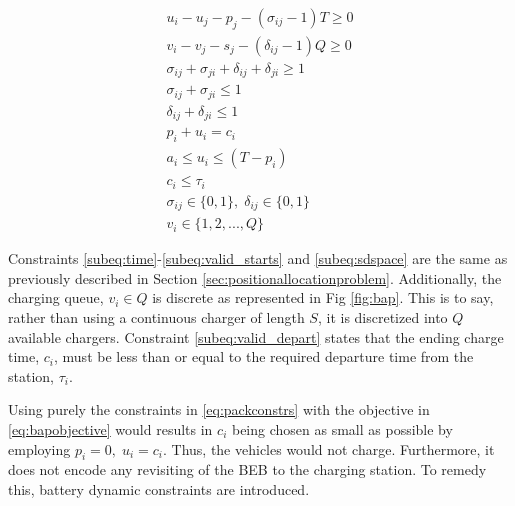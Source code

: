 \documentclass[letterpaper, 10pt, conference]{IEEEtran}
\begin{document}
\begin{subequations}
\label{eq:packconstrs}
\begin{align}
    u_i - u_j - p_j - (\sigma_{ij} - 1)T \geq 0                      \label{subeq:time}         \\
    v_i - v_j - s_j - (\delta_{ij} - 1)Q \geq 0                      \label{subeq:space}        \\
    \sigma_{ij} + \sigma_{ji} + \delta_{ij} + \delta_{ji} \geq 1     \label{subeq:valid_pos}    \\
    \sigma_{ij} + \sigma_{ji} \leq 1                                 \label{subeq:sigma}        \\
    \delta_{ij} + \delta_{ji} \leq 1                                 \label{subeq:delta}        \\
    p_i + u_i = c_i                                                  \label{subeq:detach}       \\
    a_i \leq u_i \leq (T - p_i)                                      \label{subeq:valid_starts} \\
    c_i \leq \tau_i                                                  \label{subeq:valid_depart} \\
    \sigma_{ij} \in \{0,1\},\;\delta_{ij} \in \{0,1\}                \label{subeq:sdspace}      \\
    v_i \in \{1,2, ... , Q\}                                         \label{subeq:vspace}
\end{align}
\end{subequations}

Constraints \eqref{subeq:time}-\eqref{subeq:valid_starts} and \eqref{subeq:sdspace} are the same as previously described in Section \ref{sec:positionallocationproblem}. Additionally, the charging queue, $v_i \in Q$ is discrete as represented in Fig \ref{fig:bap}. This is to say, rather than using a continuous charger of length $S$, it is discretized into $Q$ available chargers. Constraint \eqref{subeq:valid_depart} states that the ending charge time, $c_i$, must be less than or equal to the required departure time from the station, $\tau_i$.

Using purely the constraints in \eqref{eq:packconstrs} with the objective in \eqref{eq:bapobjective} would results in $c_i$ being chosen as small as possible by employing $p_i = 0,\; u_i = c_i$. Thus, the vehicles would not charge. Furthermore, it does not encode any revisiting of the BEB to the charging station. To remedy this, battery dynamic constraints are introduced.
\end{document}

